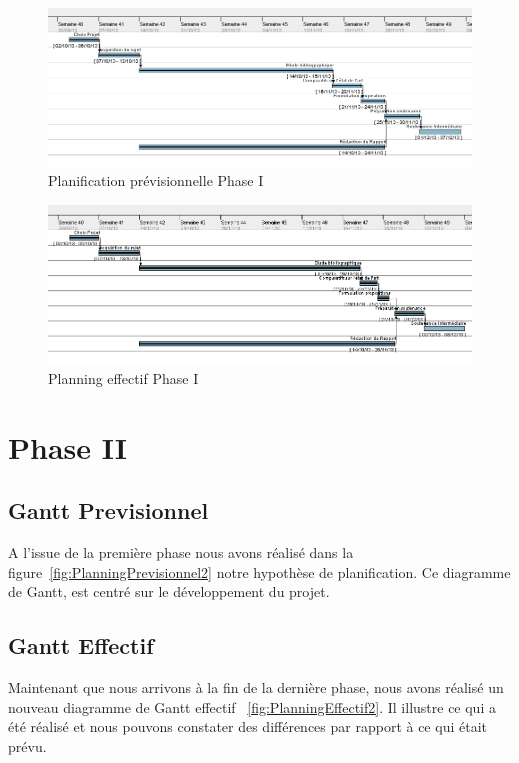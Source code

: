 \documentclass[11pt, french,screen]{report-rd-info}
\begin{document}
\begin{figure}
	\centering
		\includegraphics[width=1\textwidth]{Gantts/p1_previsionnel}
	\caption{Planification prévisionnelle Phase I}
	\label{fig:PlanningPrevisionnel}
\end{figure}
\begin{figure}
	\centering
		\includegraphics[width=1\textwidth]{Gantts/p1_effectif}
	\caption{Planning effectif Phase I}
	\label{fig:PlanningEffectif}
\end{figure}



\section{Phase II}
\subsection{Gantt Previsionnel}
A l'issue de la première phase nous avons réalisé dans la figure~\ref{fig:PlanningPrevisionnel2} notre hypothèse de planification. Ce diagramme de Gantt, est centré sur le développement du projet.

\subsection{Gantt Effectif}
Maintenant que nous arrivons à la fin de la dernière phase, nous avons réalisé un nouveau diagramme de Gantt effectif ~\ref{fig:PlanningEffectif2}. Il illustre ce qui a été réalisé et nous pouvons constater des différences par rapport à ce qui était prévu.
\end{document}
